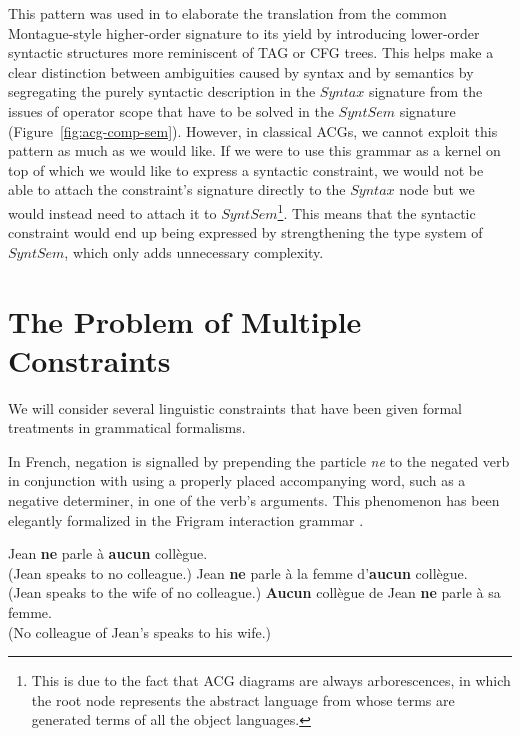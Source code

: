 \documentclass{llncs}
\begin{document}
This pattern was used in \cite{pogodalla2007generalizing} to elaborate the
translation from the common Montague-style \cite{montague1973proper}
higher-order signature to its yield by introducing lower-order syntactic
structures more reminiscent of TAG or CFG trees. This helps make a clear
distinction between ambiguities caused by syntax and by semantics by
segregating the purely syntactic description in the $Syntax$ signature from
the issues of operator scope that have to be solved in the $SyntSem$ signature
(Figure~\ref{fig:acg-comp-sem}). However, in classical ACGs, we cannot exploit
this pattern as much as we would like. If we were to use this grammar as a
kernel on top of which we would like to express a syntactic constraint, we
would not be able to attach the constraint's signature directly to the
$Syntax$ node but we would instead need to attach it to
$SyntSem$\footnote{This is due to the fact that ACG diagrams are always
  arborescences, in which the root node represents the abstract language from
  whose terms are generated terms of all the object languages.}. This means
that the syntactic constraint would end up being expressed by strengthening
the type system of $SyntSem$, which only adds unnecessary complexity.


\section{The Problem of Multiple Constraints}
\label{sec:constraints}

We will consider several linguistic constraints that have been given
formal treatments in grammatical formalisms.

In French, negation is signalled by prepending the particle \emph{ne} to the
negated verb in conjunction with using a properly placed accompanying word,
such as a negative determiner, in one of the verb's arguments. This phenomenon
has been elegantly formalized in the Frigram interaction grammar
\cite{perrier2007french}.

\begin{exe}
  \ex \label{ex:aucun-shallow} Jean \textbf{ne} parle à \textbf{aucun} collègue. \\
      (Jean speaks to no colleague.)
  \ex \label{ex:aucun-deep-obj} Jean \textbf{ne} parle à la femme d'\textbf{aucun} collègue. \\
      (Jean speaks to the wife of no colleague.)
  \ex \label{ex:aucun-deep-subj} \textbf{Aucun} collègue de Jean \textbf{ne} parle à sa femme. \\
      (No colleague of Jean's speaks to his wife.)
\end{exe}
\end{document}
